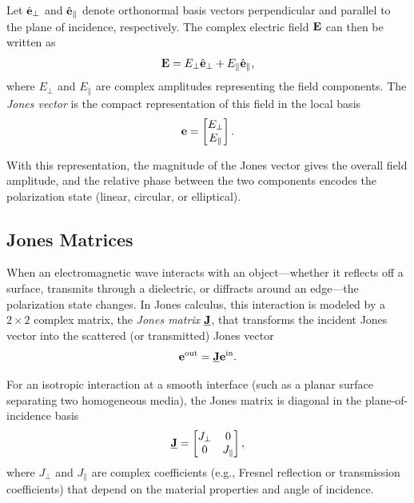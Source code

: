 Let $\hat{\mathbf{e}}_{\perp}$ and $\hat{\mathbf{e}}_{\parallel}$ denote orthonormal basis vectors perpendicular and parallel to the plane of incidence, respectively. The complex electric field $\mathbf{E}$ can then be written as
\begin{equation}
  \mathbf{E} = E_{\perp} \hat{\mathbf{e}}_{\perp} + E_{\parallel} \hat{\mathbf{e}}_{\parallel},
\end{equation}
where $E_{\perp}$ and $E_{\parallel}$ are complex amplitudes representing the field components. The \emph{Jones vector} is the compact representation of this field in the local basis
\begin{equation}\label{eq:jones-vector}
  \mathbf{e} =
  \begin{bmatrix}
    E_{\perp} \\
    E_{\parallel}
  \end{bmatrix}.
\end{equation}

With this representation, the magnitude of the Jones vector gives the overall field amplitude, and the relative phase between the two components encodes the polarization state (linear, circular, or elliptical).

\subsection{Jones Matrices}

When an electromagnetic wave interacts with an object---whether it reflects off a surface, transmits through a dielectric, or diffracts around an edge---the polarization state changes. In Jones calculus, this interaction is modeled by a $2 \times 2$ complex matrix, the \emph{Jones matrix} $\underline{\mathbf{J}}$, that transforms the incident Jones vector into the scattered (or transmitted) Jones vector
\begin{equation}
  \mathbf{e}^{\text{out}} = \underline{\mathbf{J}} \mathbf{e}^{\text{in}}.\label{eq:jones-matrix}
\end{equation}

For an isotropic interaction at a smooth interface (such as a planar surface separating two homogeneous media), the Jones matrix is diagonal in the plane-of-incidence basis
\begin{equation}
  \underline{\mathbf{J}} =
  \begin{bmatrix}
    J_{\perp} & 0 \\
    0 & J_{\parallel}
  \end{bmatrix},\label{eq:jones-diagonal}
\end{equation}
where $J_{\perp}$ and $J_{\parallel}$ are complex coefficients (e.g., Fresnel reflection or transmission coefficients) that depend on the material properties and angle of incidence.


